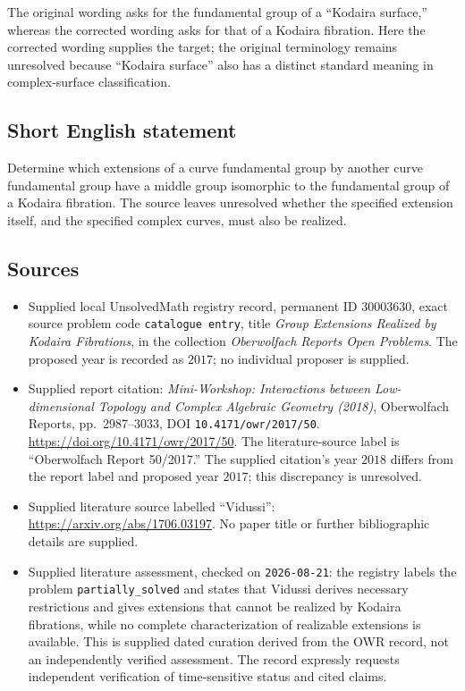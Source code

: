 \documentclass[11pt]{article}
\begin{document}
The original wording asks for the fundamental group of a ``Kodaira surface,'' whereas the corrected wording asks for that of a Kodaira fibration. Here the corrected wording supplies the target; the original terminology remains unresolved because ``Kodaira surface'' also has a distinct standard meaning in complex-surface classification.
\subsection{Short English statement}
Determine which extensions of a curve fundamental group by another curve fundamental group have a middle group isomorphic to the fundamental group of a Kodaira fibration. The source leaves unresolved whether the specified extension itself, and the specified complex curves, must also be realized.
\subsection{Sources}
\begin{itemize}
\item Supplied local UnsolvedMath registry record, permanent ID \(30003630\), exact source problem code \texttt{catalogue entry}, title \emph{Group Extensions Realized by Kodaira Fibrations}, in the collection \emph{Oberwolfach Reports Open Problems}. The proposed year is recorded as \(2017\); no individual proposer is supplied.
\item Supplied report citation: \emph{Mini-Workshop: Interactions between Low-dimensional Topology and Complex Algebraic Geometry (2018)}, Oberwolfach Reports, pp.\ 2987--3033, DOI \texttt{10.4171/owr/2017/50}. \url{https://doi.org/10.4171/owr/2017/50}. The literature-source label is ``Oberwolfach Report 50/2017.'' The supplied citation's year \(2018\) differs from the report label and proposed year \(2017\); this discrepancy is unresolved.
\item Supplied literature source labelled ``Vidussi'': \url{https://arxiv.org/abs/1706.03197}. No paper title or further bibliographic details are supplied.
\item Supplied literature assessment, checked on \texttt{2026-08-21}: the registry labels the problem \texttt{partially\_solved} and states that Vidussi derives necessary restrictions and gives extensions that cannot be realized by Kodaira fibrations, while no complete characterization of realizable extensions is available. This is supplied dated curation derived from the OWR record, not an independently verified assessment. The record expressly requests independent verification of time-sensitive status and cited claims.
\end{itemize}
\end{document}
